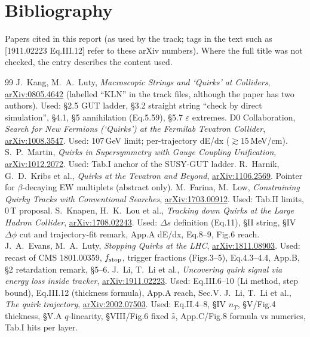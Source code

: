 \documentclass[11pt,a4paper]{article}
\newcommand{\arx}[1]{\href{https://arxiv.org/abs/#1}{arXiv:#1}}
\newcommand{\Ds}{\Delta s}
\begin{document}
\section{Bibliography}\label{app:bib}
Papers cited in this report (as used by the track; tags in the text such as [1911.02223 Eq.III.12] refer to these arXiv numbers). Where the full title was not checked, the entry describes the content used.
\begingroup\small
\renewcommand{\section}[2]{}
\begin{thebibliography}{99}\setlength{\itemsep}{1pt}
 J.~Kang, M.~A.~Luty, \emph{Macroscopic Strings and `Quirks' at Colliders}, \arx{0805.4642} (labelled ``KLN'' in the track files, although the paper has two authors). Used: \S2.5 GUT ladder, \S3.2 straight string ``check by direct simulation'', \S4.1, \S5 annihilation (Eq.5.59), \S5.7 $\varepsilon$ extremes.
 D0 Collaboration, \emph{Search for New Fermions (`Quirks') at the Fermilab Tevatron Collider}, \arx{1008.3547}. Used: 107\,GeV limit; per-trajectory dE/dx ($\gtrsim15$\,MeV/cm).
 S.~P.~Martin, \emph{Quirks in Supersymmetry with Gauge Coupling Unification}, \arx{1012.2072}. Used: Tab.I anchor of the SUSY-GUT ladder.
 R.~Harnik, G.~D.~Kribs et al., \emph{Quirks at the Tevatron and Beyond}, \arx{1106.2569}. Pointer for $\beta$-decaying EW multiplets (abstract only).
 M.~Farina, M.~Low, \emph{Constraining Quirky Tracks with Conventional Searches}, \arx{1703.00912}. Used: Tab.II limits, 0\,T proposal.
 S.~Knapen, H.~K.~Lou et al., \emph{Tracking down Quirks at the Large Hadron Collider}, \arx{1708.02243}. Used: $\Ds$ definition (Eq.11), \S II string, \S IV $\Delta\phi$ cut and trajectory-fit remark, App.A dE/dx, Eq.8--9, Fig.6 reach.
 J.~A.~Evans, M.~A.~Luty, \emph{Stopping Quirks at the LHC}, \arx{1811.08903}. Used: recast of CMS 1801.00359, $f_{\rm stop}$, trigger fractions (Figs.3--5), Eq.4.3--4.4, App.B, \S2 retardation remark, \S5--6.
 J.~Li, T.~Li et al., \emph{Uncovering quirk signal via energy loss inside tracker}, \arx{1911.02223}. Used: Eq.III.6--10 (Li method, step bound), Eq.III.12 (thickness formula), App.A reach, Sec.V.
 J.~Li, T.~Li et al., \emph{The quirk trajectory}, \arx{2002.07503}. Used: Eq.II.4--8, \S IV $n_T$, \S V/Fig.4 thickness, \S V.A $q$-linearity, \S VIII/Fig.6 fixed $\hat s$, App.C/Fig.8 formula vs numerics, Tab.I hits per layer.

\end{thebibliography}
\end{document}
